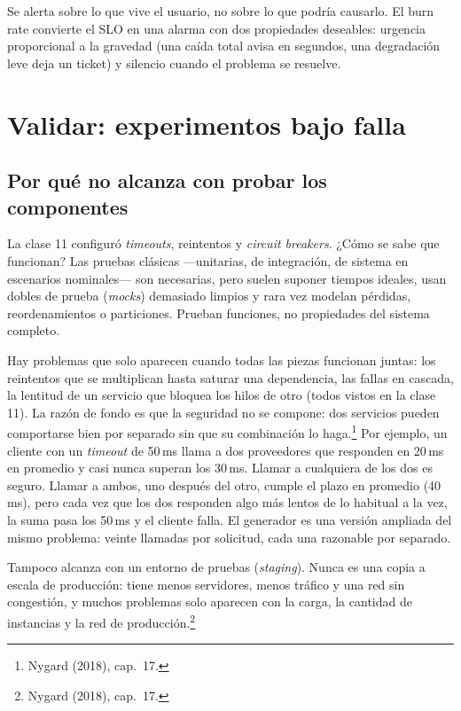 \documentclass[variant=apuntes,cover=institutional,mode=screen]{ua-engineering-v6-article}
\begin{document}
\begin{uakeybox}
Se alerta sobre lo que vive el usuario, no sobre lo que podría causarlo. El burn rate convierte el SLO en una alarma con dos propiedades deseables: urgencia proporcional a la gravedad (una caída total avisa en segundos, una degradación leve deja un ticket) y silencio cuando el problema se resuelve.
\end{uakeybox}

\section{Validar: experimentos bajo falla}\label{sec:chaos}

\subsection{Por qué no alcanza con probar los componentes}

La clase 11 configuró \emph{timeouts}, reintentos y \emph{circuit breakers}. ¿Cómo se sabe que funcionan? Las pruebas clásicas ---unitarias, de integración, de sistema en escenarios nominales--- son necesarias, pero suelen suponer tiempos ideales, usan dobles de prueba (\emph{mocks}) demasiado limpios y rara vez modelan pérdidas, reordenamientos o particiones. Prueban funciones, no propiedades del sistema completo.

Hay problemas que solo aparecen cuando todas las piezas funcionan juntas: los reintentos que se multiplican hasta saturar una dependencia, las fallas en cascada, la lentitud de un servicio que bloquea los hilos de otro (todos vistos en la clase 11). La razón de fondo es que la seguridad no se compone: dos servicios pueden comportarse bien por separado sin que su combinación lo haga.\footnote{Nygard (2018), cap.~17.} Por ejemplo, un cliente con un \emph{timeout} de 50\,ms llama a dos proveedores que responden en 20\,ms en promedio y casi nunca superan los 30\,ms. Llamar a cualquiera de los dos es seguro. Llamar a ambos, uno después del otro, cumple el plazo en promedio (40\,ms), pero cada vez que los dos responden algo más lentos de lo habitual a la vez, la suma pasa los 50\,ms y el cliente falla. El generador es una versión ampliada del mismo problema: veinte llamadas por solicitud, cada una razonable por separado.

Tampoco alcanza con un entorno de pruebas (\emph{staging}). Nunca es una copia a escala de producción: tiene menos servidores, menos tráfico y una red sin congestión, y muchos problemas solo aparecen con la carga, la cantidad de instancias y la red de producción.\footnote{Nygard (2018), cap.~17.}
\end{document}
